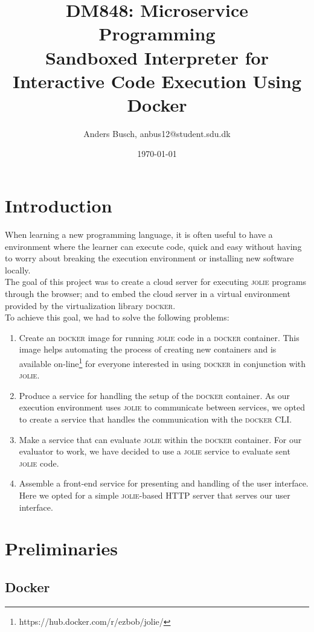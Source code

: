 \documentclass[12pt]{article}
\title{ \textbf{DM848}: Microservice Programming \\ {\Large Sandboxed Interpreter for Interactive Code Execution Using Docker} }
\author{Anders Busch, anbus12@student.sdu.dk}
\date{\today \\ \hrulefill{}}
\newcommand{\docker}[0] {\textsc{docker}}
\newcommand{\jolie}[0] {\textsc{jolie}}
\begin{document}
\maketitle
\tableofcontents
\newpage

\section{Introduction}

When learning a new programming language, it is often useful to have a environment where the learner can execute code, quick and easy without having to worry about breaking the execution environment or installing new software locally. \\

\noindent{}The goal of this project was to create a cloud server for executing \jolie{} programs through the browser; and to embed the cloud server in a virtual environment provided by the virtualization library \docker{}.\\

\noindent{}To achieve this goal, we had to solve the following problems:
\begin{enumerate}
	\item Create an \docker{} image for running \jolie{} code in a \docker{} container. This image helps automating the process of creating new containers and is available on-line\footnote{https://hub.docker.com/r/ezbob/jolie/} for everyone interested in using \docker{} in conjunction with \jolie{}.
	\item Produce a service for handling the setup of the \docker{} container. As our execution environment uses \jolie{} to communicate between services, we opted to create a service that handles the communication with the \docker{} CLI.
	\item Make a service that can evaluate \jolie{} within the \docker{} container. For our evaluator to work, we have decided to use a \jolie{} service to evaluate sent \jolie{} code.
	\item Assemble a front-end service for presenting and handling of the user interface. Here we opted for a simple \jolie{}-based HTTP server that serves our user interface. 
\end{enumerate}


\section{Preliminaries}

\subsection{Docker}
\end{document}
